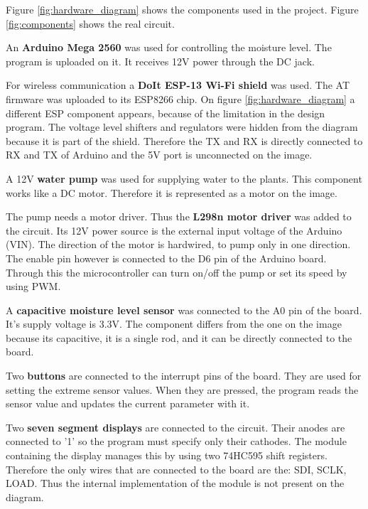 Figure \ref{fig:hardware_diagram} shows the components used in the project. Figure \ref{fig:components} shows the real circuit.

An \textbf{Arduino Mega 2560} was used for controlling the moisture level. The program is uploaded on it. It receives 12V power through the DC jack.

For wireless communication a \textbf{DoIt ESP-13 Wi-Fi shield} was used. The AT firmware was uploaded to its ESP8266 chip. On figure \ref{fig:hardware_diagram} a different ESP component appears, because of the limitation in the design program. The voltage level shifters and regulators were hidden from the diagram because it is part of the shield. Therefore the TX and RX is directly connected to RX and TX of Arduino and the 5V port is unconnected on the image.

A 12V \textbf{water pump} was used for supplying water to the plants. This component works like a DC motor. Therefore it is represented as a motor on the image.

The pump needs a motor driver. Thus the \textbf{L298n motor driver} was added to the circuit. Its 12V power source is the external input voltage of the Arduino (VIN). The direction of the motor is hardwired, to pump only in one direction. The enable pin however is connected to the D6 pin of the Arduino board. Through this the microcontroller can turn on/off the pump or set its speed by using PWM.

A \textbf{capacitive moisture level sensor} was connected to the A0 pin of the board. It's supply voltage is 3.3V. The component differs from the one on the image because its capacitive, it is a single rod, and it can be directly connected to the board.

Two \textbf{buttons} are connected to the interrupt pins of the board. They are used for setting the extreme sensor values. When they are pressed, the program reads the sensor value and updates the current parameter with it.


Two \textbf{seven segment displays} are connected to the circuit. Their anodes are connected to '1' so the program must specify only their cathodes. The module containing the display manages this by using two 74HC595 shift registers. Therefore the only wires that are connected to the board are the: SDI, SCLK, LOAD. Thus the internal implementation of the module is not present on the diagram.
